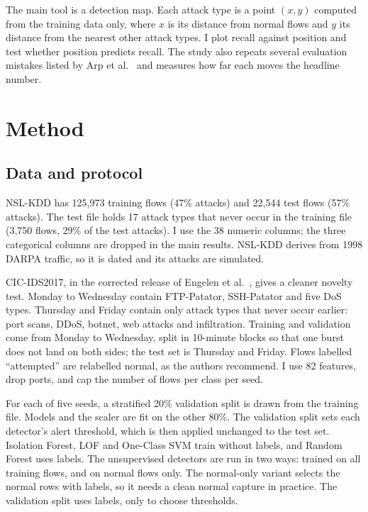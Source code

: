 \documentclass[10pt]{article}
\begin{document}
The main tool is a detection map. Each attack type is a point $(x, y)$ computed from the training data only,
where $x$ is its distance from normal flows and $y$ its distance from the nearest other attack types. I plot
recall against position and test whether position predicts recall. The study also repeats several evaluation
mistakes listed by Arp et al.\ \cite{arp2022} and measures how far each moves the headline number.

\section{Method}

\subsection{Data and protocol}

NSL-KDD \cite{tavallaee2009} has 125,973 training flows (47\% attacks) and 22,544 test flows (57\% attacks). The
test file holds 17 attack types that never occur in the training file (3,750 flows, 29\% of the test
attacks). I use the 38 numeric columns; the three categorical columns are dropped in the main results. NSL-KDD
derives from 1998 DARPA traffic, so it is dated and its attacks are simulated.

CIC-IDS2017, in the corrected release of Engelen et al.\ \cite{engelen2021}, gives a cleaner novelty test.
Monday to Wednesday contain FTP-Patator, SSH-Patator and five DoS types. Thursday and Friday contain only
attack types that never occur earlier: port scans, DDoS, botnet, web attacks and infiltration. Training and
validation come from Monday to Wednesday, split in 10-minute blocks so that one burst does not land on both
sides; the test set is Thursday and Friday. Flows labelled ``attempted'' are relabelled normal, as the authors
recommend. I use 82 features, drop ports, and cap the number of flows per class per seed.

For each of five seeds, a stratified 20\% validation split is drawn from the training file. Models and the
scaler are fit on the other 80\%. The validation split sets each detector's alert threshold, which is then
applied unchanged to the test set. Isolation Forest, LOF and One-Class SVM \cite{liu2008,breunig2000,
scholkopf2001} train without labels, and Random Forest \cite{breiman2001} uses labels. The unsupervised
detectors are run in two ways: trained on all training flows, and on normal flows only. The normal-only variant
selects the normal rows with labels, so it needs a clean normal capture in practice. The validation split uses
labels, only to choose thresholds.
\end{document}
